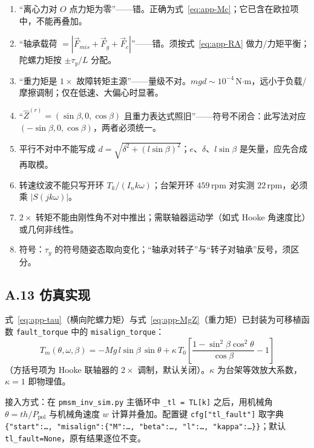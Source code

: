 \documentclass[11pt,a4paper]{article}
\theoremstyle{remark}\newtheorem{remark}{注}
\begin{document}
\begin{enumerate}
  \item “离心力对 $O$ 点力矩为零”——错。正确为式~\eqref{eq:app-Mc}；它已含在欧拉项中，不能再叠加。
  \item “轴承载荷 $=|\vec F_{mis}+\vec F_g+\vec F_c|$”——错。须按式~\eqref{eq:app-RA} 做力/力矩平衡；陀螺力矩按 $\pm\tau_y/L$ 分配。
  \item “重力矩是 $1\times$ 故障转矩主源”——量级不对。$mgd\sim10^{-4}$\,N$\cdot$m，远小于负载/摩擦调制；仅在低速、大偏心时显著。
  \item “$\hat Z^{(r)}=(\sin\beta,0,\cos\beta)$ 且重力表达式照旧”——符号不闭合：此写法对应 $(-\sin\beta,0,\cos\beta)$，两者必须统一。
  \item 平行不对中不能写成 $d=\sqrt{\delta^2+(l\sin\beta)^2}$；$e$、$\delta$、$l\sin\beta$ 是矢量，应先合成再取模。
  \item 转速纹波不能只写开环 $T_k/(I_nk\omega)$；台架开环 $459$\,rpm 对实测 $22$\,rpm，必须乘 $|S(jk\omega)|$。
  \item $2\times$ 转矩不能由刚性角不对中推出；需联轴器运动学（如式 Hooke 角速度比）或几何非线性。
  \item 符号：$\tau_y$ 的符号随姿态取向变化；“轴承对转子”与“转子对轴承”反号，须区分。
\end{enumerate}

\subsection*{A.13 仿真实现}

式~\eqref{eq:app-tau}（横向陀螺力矩）与式~\eqref{eq:app-MgZ}（重力矩）已封装为可移植函数 \texttt{fault\_torque} 中的 \texttt{misalign\_torque}：
\begin{equation}
T_m(\theta,\omega,\beta)
=-M g\,l\sin\beta\,\sin\theta
+\kappa\,T_0\left[\frac{1-\sin^2\beta\cos^2\theta}{\cos\beta}-1\right]
\label{eq:app-impl-mis}
\end{equation}
（方括号项为 Hooke 联轴器的 $2\times$ 调制，默认关闭）。$\kappa$ 为台架等效放大系数，$\kappa=1$ 即物理值。

接入方式：在 \texttt{pmsm\_inv\_sim.py} 主循环中 \texttt{\_tl = TL[k]} 之后，用机械角 $\theta=th/P_{\mathrm{pol}}$ 与机械角速度 $w$ 计算并叠加。配置键 \texttt{cfg["tl\_fault"]} 取字典 \texttt{\{"start":\ldots,\ "misalign":\{"M":\ldots,\ "beta":\ldots,\ "l":\ldots,\ "kappa":\ldots\}\}}；默认 \texttt{tl\_fault=None}，原有结果逐位不变。
\end{document}

